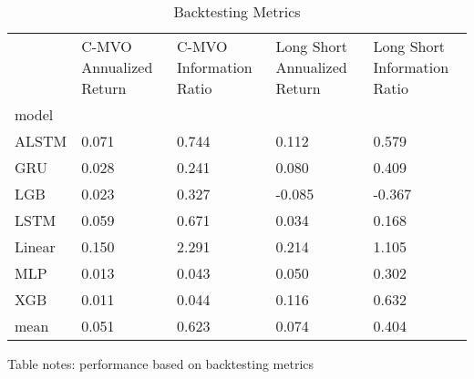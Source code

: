 \documentclass[10pt,letterpaper]{article}
\begin{document}
\begin{table}[!ht]
\centering
\caption{Backtesting Metrics}
\label{Backtest Metric}
\begin{tabular}{lp{1.5cm}p{1.5cm}p{1.5cm}p{1.5cm}}
\toprule
{} &  C-MVO Annualized Return &  C-MVO Information Ratio &  Long Short Annualized Return &  Long Short Information Ratio \\
model  &                          &                          &                               &                               \\
\midrule
ALSTM  &                    0.071 &                    0.744 &                         0.112 &                         0.579 \\
GRU    &                    0.028 &                    0.241 &                         0.080 &                         0.409 \\
LGB    &                    0.023 &                    0.327 &                        -0.085 &                        -0.367 \\
LSTM   &                    0.059 &                    0.671 &                         0.034 &                         0.168 \\
Linear &                    0.150 &                    2.291 &                         0.214 &                         1.105 \\
MLP    &                    0.013 &                    0.043 &                         0.050 &                         0.302 \\
XGB    &                    0.011 &                    0.044 &                         0.116 &                         0.632 \\
mean   &                    0.051 &                    0.623 &                         0.074 &                         0.404 \\
\bottomrule
\end{tabular}



\begin{flushleft}
Table notes: performance based on backtesting metrics
\end{flushleft}
\label{table1}
\end{table}
\end{document}

